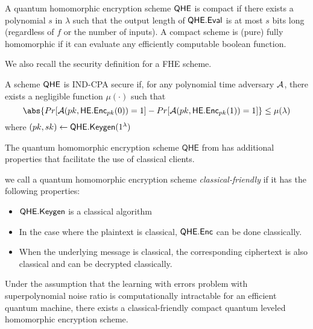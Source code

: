 \begin{definition}
	A quantum homomorphic encryption scheme $\mathsf{QHE}$ is compact if
	there exists a polynomial $s$ in $\lambda$ such that the output length of $\mathsf{QHE.Eval}$ is at most $s$ bits long (regardless of $f$ or
	the number of inputs). A compact scheme is (pure) fully homomorphic if it can evaluate any efficiently computable
	boolean function.
\end{definition}

We also recall the security definition for a FHE scheme.

\begin{definition}
	A scheme $\mathsf{QHE}$ is IND-CPA secure if, for any polynomial time adversary $\mathcal{A}$, there exists a negligible function $\mu(\cdot)$ such that
	$$\abs{Pr[\cA(pk, \mathsf{HE.Enc}_{pk}(0))=1]-Pr[\cA(pk, \mathsf{HE.Enc}_{pk}(1))=1]}\leq\mu(\lambda)$$
	where $(pk, sk)\leftarrow\mathsf{QHE.Keygen}(1^\lambda)$
\end{definition}

The quantum homomorphic encryption scheme $\mathsf{QHE}$ from \cite{mahadev_qfhe} has additional properties that facilitate the use of classical clients.

\begin{definition} \label{def:classical-friendly}
	we call a quantum homomorphic encryption scheme \emph{classical-friendly} if it has the following properties:
	\begin{itemize}
		\item $\mathsf{QHE.Keygen}$ is a classical algorithm
		\item In the case where the plaintext is classical, $\mathsf{QHE.Enc}$ can be done classically.
		\item When the underlying message is classical, the corresponding ciphertext is also classical and can be decrypted classically.
	\end{itemize}
\end{definition}

\begin{theorem} 
	Under the assumption that the learning with errors problem with superpolynomial noise ratio is computationally intractable for an efficient quantum machine,
	there exists a classical-friendly compact quantum leveled homomorphic encryption scheme.
\end{theorem}

